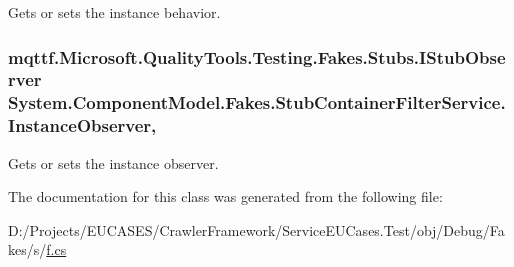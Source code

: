 Gets or sets the instance behavior.

\hypertarget{class_system_1_1_component_model_1_1_fakes_1_1_stub_container_filter_service_a9878407a1af35f65f89661d9a40eda1a}{
\subsubsection[{Instance\-Observer}]{\setlength{\rightskip}{0pt plus 5cm}mqttf.\-Microsoft.\-Quality\-Tools.\-Testing.\-Fakes.\-Stubs.\-I\-Stub\-Observer System.\-Component\-Model.\-Fakes.\-Stub\-Container\-Filter\-Service.\-Instance\-Observer\hspace{0.3cm}{\ttfamily [get]}, {\ttfamily [set]}}}\label{class_system_1_1_component_model_1_1_fakes_1_1_stub_container_filter_service_a9878407a1af35f65f89661d9a40eda1a}


Gets or sets the instance observer.



The documentation for this class was generated from the following file\-:\begin{DoxyCompactItemize}
\item 
D\-:/\-Projects/\-E\-U\-C\-A\-S\-E\-S/\-Crawler\-Framework/\-Service\-E\-U\-Cases.\-Test/obj/\-Debug/\-Fakes/s/\hyperlink{s_2f_8cs}{f.\-cs}\end{DoxyCompactItemize}
